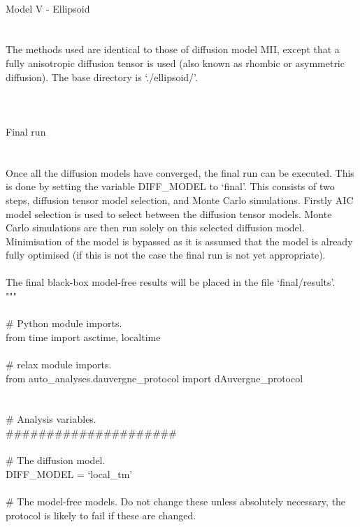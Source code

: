 \begin{htmlonly}
\begin{htmlonly}
\begin{exampleenv}
 \\
Model V - Ellipsoid \\
~~~~~~~~~~~~~~~~~~~ \\
 \\
The methods used are identical to those of diffusion model MII, except that a fully anisotropic diffusion tensor is used (also known as rhombic or asymmetric diffusion).  The base directory is `./ellipsoid/'. \\
 \\
 \\
 \\
Final run \\
~~~~~~~~~ \\
 \\
Once all the diffusion models have converged, the final run can be executed.  This is done by setting the variable DIFF\_MODEL to `final'.  This consists of two steps, diffusion tensor model selection, and Monte Carlo simulations.  Firstly AIC model selection is used to select between the diffusion tensor models.  Monte Carlo simulations are then run solely on this selected diffusion model.  Minimisation of the model is bypassed as it is assumed that the model is already fully optimised (if this is not the case the final run is not yet appropriate). \\
 \\
The final black-box model-free results will be placed in the file `final/results'. \\
""" \\
 \\
\# Python module imports. \\
from time import asctime, localtime \\
 \\
\# relax module imports. \\
from auto\_analyses.dauvergne\_protocol import dAuvergne\_protocol \\
 \\
 \\
\# Analysis variables. \\
\#\#\#\#\#\#\#\#\#\#\#\#\#\#\#\#\#\#\#\#\# \\
 \\
\# The diffusion model. \\
DIFF\_MODEL = `local\_tm' \\
 \\
\# The model-free models.  Do not change these unless absolutely necessary, the protocol is likely to fail if these are changed. \\

\end{exampleenv}
\end{htmlonly}
\end{htmlonly}
